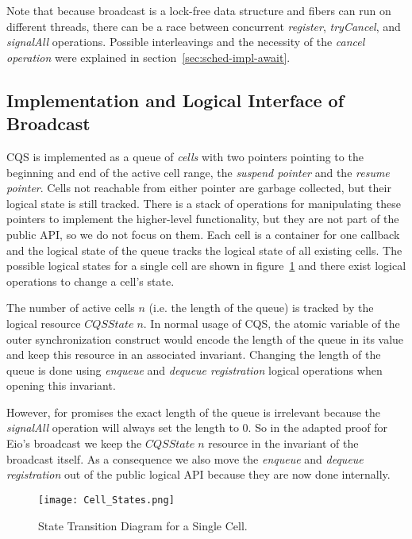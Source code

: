 Note that because broadcast is a lock-free data structure and fibers can run on different threads, there can be a race between concurrent \emph{register}, \emph{tryCancel}, and \emph{signalAll} operations.
Possible interleavings and the necessity of the \emph{cancel operation} were explained in section~\ref{sec:sched-impl-await}.

\subsection{Implementation and Logical Interface of Broadcast}
\label{sec:broadcast-impl}


CQS is implemented as a queue of \emph{cells} with two pointers pointing to the beginning and end of the active cell range, the \emph{suspend pointer} and the \emph{resume pointer}.
Cells not reachable from either pointer are garbage collected, but their logical state is still tracked.
There is a stack of operations for manipulating these pointers to implement the higher-level functionality, but they are not part of the public API, so we do not focus on them.
Each cell is a container for one callback and the logical state of the queue tracks the logical state of all existing cells.
The possible logical states for a single cell are shown in figure~\ref{fig:cqs-cell-states} and there exist logical operations to change a cell's state.

The number of active cells \(n\) (i.e. the length of the queue) is tracked by the logical resource \(CQSState\; n\).
In normal usage of CQS, the atomic variable of the outer synchronization construct would encode the length of the queue in its value and keep this resource in an associated invariant.
Changing the length of the queue is done using \emph{enqueue} and \emph{dequeue registration} logical operations when opening this invariant.

However, for promises the exact length of the queue is irrelevant because the \emph{signalAll} operation will always set the length to 0.
So in the adapted proof for Eio's broadcast we keep the \(CQSState\; n\) resource in the invariant of the broadcast itself.
As a consequence we also move the \emph{enqueue} and \emph{dequeue registration} out of the public logical API because they are now done internally.

\begin{figure}[ht]
  \texttt{[image: Cell\_States.png]}
  \caption{State Transition Diagram for a Single Cell.}
  \label{fig:cqs-cell-states}
\end{figure}

